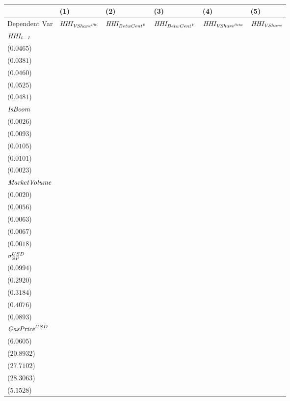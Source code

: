 \begin{tabular}{llllll}
\toprule
 & (1) & (2) & (3) & (4) & (5) \\
\midrule
Dependent Var & ${\it HHI_{{VShare}^{\it Ulti}}}$ & ${\it HHI_{{BetwCent}^{\it E}}}$ & ${\it HHI_{{BetwCent}^{\it V}}}$ & ${\it HHI_{{VShare}^{\it Betw}}}$ & ${\it HHI_{VShare}}$ \\
$\it HHI_{t-1}$ & \makecell{$0.4547^{***}$ \\ ($0.0465$)} & \makecell{$0.6299^{***}$ \\ ($0.0381$)} & \makecell{$0.6447^{***}$ \\ ($0.0460$)} & \makecell{$0.5648^{***}$ \\ ($0.0525$)} & \makecell{$0.4449^{***}$ \\ ($0.0481$)} \\
${\it IsBoom}$ & \makecell{$-0.0017^{}$ \\ ($0.0026$)} & \makecell{$0.0345^{***}$ \\ ($0.0093$)} & \makecell{$0.0428^{***}$ \\ ($0.0105$)} & \makecell{$0.0420^{***}$ \\ ($0.0101$)} & \makecell{$0.0036^{}$ \\ ($0.0023$)} \\
${\it MarketVolume}$ & \makecell{$0.0018^{}$ \\ ($0.0020$)} & \makecell{$-0.0005^{}$ \\ ($0.0056$)} & \makecell{$-0.0071^{}$ \\ ($0.0063$)} & \makecell{$0.0021^{}$ \\ ($0.0067$)} & \makecell{$0.0018^{}$ \\ ($0.0018$)} \\
${\it \sigma}^{USD}_{SP}$ & \makecell{$0.1265^{}$ \\ ($0.0994$)} & \makecell{$0.3516^{}$ \\ ($0.2920$)} & \makecell{$-0.6414^{**}$ \\ ($0.3184$)} & \makecell{$-0.6178^{}$ \\ ($0.4076$)} & \makecell{$0.0185^{}$ \\ ($0.0893$)} \\
${\it GasPrice}^{USD}$ & \makecell{$-16.7012^{***}$ \\ ($6.0605$)} & \makecell{$46.9715^{**}$ \\ ($20.8932$)} & \makecell{$49.7317^{*}$ \\ ($27.7102$)} & \makecell{$-37.0482^{}$ \\ ($28.3063$)} & \makecell{$-13.1549^{**}$ \\ ($5.1528$)} \\

\end{tabular}
